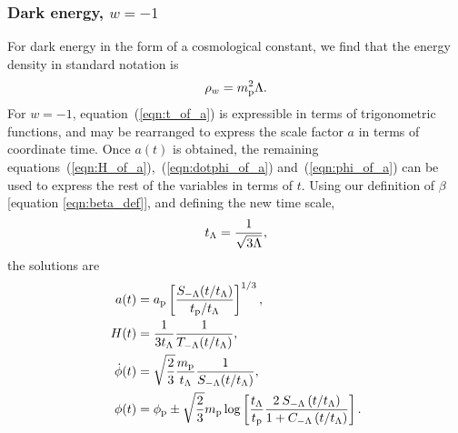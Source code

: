 \subsubsection{Dark energy, $w=-1$}
For dark energy in the form of a cosmological constant, we find that the energy density in standard notation is
%
\begin{equation}
  \rho_w = m_{\mathrm{p}}^2\Lambda.
\end{equation}
%
For $w=-1$, equation~(\ref{eqn:t_of_a}) is expressible in terms of trigonometric functions, and may be rearranged to express the scale factor $a$ in terms of coordinate time. Once $a(t)$ is obtained, the remaining equations~(\ref{eqn:H_of_a}),~(\ref{eqn:dotphi_of_a}) and~(\ref{eqn:phi_of_a}) can be used to express the rest of the variables in terms of $t$. Using our definition of $\beta$ [equation \nolinebreak\ref{eqn:beta_def}], and defining the new time scale,
%
\begin{equation}
  t_\mathrm{\Lambda} = \frac{1}{\sqrt{3\Lambda}},
  \label{eqn:tl}
\end{equation}
%
the solutions are
%
\begin{align}
  a(t)
  &=
  a_{\mathrm{p}}\left[{\frac {S_{-\Lambda}(t/t_\mathrm{\Lambda})}{t_{\mathrm{p}}/t_\mathrm{\Lambda}}}\right]^{1/3},
  \\
  H(t)
  &=
  \frac{1}{3t_\mathrm{\Lambda}}\frac{1}{T_{-\Lambda}(t/t_\mathrm{\Lambda})},
  \\
  \dot{\phi}(t)
  &=
  \sqrt{\frac{2}{3}}\frac{m_{\mathrm{p}}}{t_\mathrm{\Lambda}}\frac{1}{S_{-\Lambda}(t/t_\mathrm{\Lambda})},
  \\
  \phi(t)
  &=
  \phi_{\mathrm{p}} \pm \sqrt{\frac{2}{3}}m_{\mathrm{p}}
  \log\left[
  \frac{t_\mathrm{\Lambda}}{t_{\mathrm{p}}} 
  \frac 
  {2\: S_{-\Lambda} \left( t/t_\mathrm{\Lambda} \right) }
  {1 + C_{-\Lambda} \left( t/t_\mathrm{\Lambda} \right)}  
  \right].
\end{align}
%


